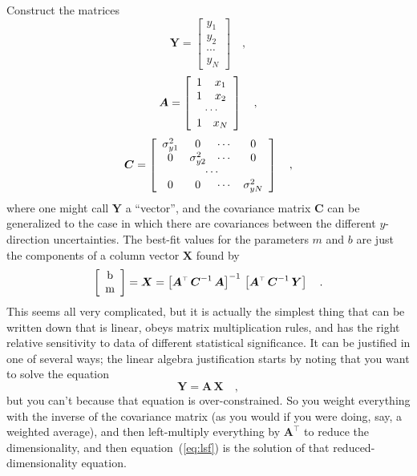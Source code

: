 \documentclass[12pt]{article}
\newcommand{\equationname}{equation}
\newcommand{\mmatrix}[1]{\boldsymbol{#1}}
\newcommand{\inverse}[1]{{#1}^{-1}}
\newcommand{\transpose}[1]{{#1}^{\scriptscriptstyle \top}}
\newcommand{\mA}{\mmatrix{A}}
\newcommand{\mAT}{\transpose{\mA}}
\newcommand{\mC}{\mmatrix{C}}
\newcommand{\mCinv}{\inverse{\mC}}
\newcommand{\mX}{\mmatrix{X}}
\newcommand{\mY}{\mmatrix{Y}}
\begin{document}
Construct the matrices
\begin{equation}
\mY = \left[\begin{array}{c}
y_1 \\
y_2 \\
\cdots \\
y_N
\end{array}\right] \quad ,
\end{equation}
\begin{equation}
\mA = \left[\begin{array}{cc}
1 & x_1 \\
1 & x_2 \\
\multicolumn{2}{c}{\cdots} \\
1 & x_N
\end{array}\right] \quad ,
\end{equation}
\begin{equation}
\mC = \left[\begin{array}{cccc}
\sigma_{y1}^{2} & 0 & \cdots & 0 \\
0 & \sigma_{y2}^{2} & \cdots & 0 \\
\multicolumn{4}{c}{\cdots} \\
0 & 0 & \cdots & \sigma_{yN}^{2}
\end{array}\right] \quad ,
\end{equation}
where one might call $\mY$ a ``vector'', and the covariance matrix
$\mC$ can be generalized to the case in which there are covariances
between the different $y$-direction uncertainties.  The best-fit
values for the parameters $m$ and $b$ are just the components of a
column vector $\mX$ found by
\begin{equation}\label{eq:lsf}
\left[\begin{array}{c} $b$ \\ $m$ \end{array}\right]
 = \mX = \inverse{\left[\mAT\,\mCinv\,\mA\right]}
  \,\left[\mAT\,\mCinv\,\mY\right] \quad .
\end{equation}
This seems all very complicated, but it is actually the simplest thing
that can be written down that is linear, obeys matrix multiplication
rules, and has the right relative sensitivity to data of different
statistical significance.  It can be justified in one of several ways;
the linear algebra justification starts by noting that you want to
solve the equation
\begin{equation}
\mY = \mA\,\mX \quad ,
\end{equation}
but you can't because that equation is over-constrained.  So you
weight everything with the inverse of the covariance matrix (as you
would if you were doing, say, a weighted average), and then
left-multiply everything by $\mAT$ to reduce the dimensionality, and
then \equationname~(\ref{eq:lsf}) is the solution of that
reduced-dimensionality equation.
\end{document}
